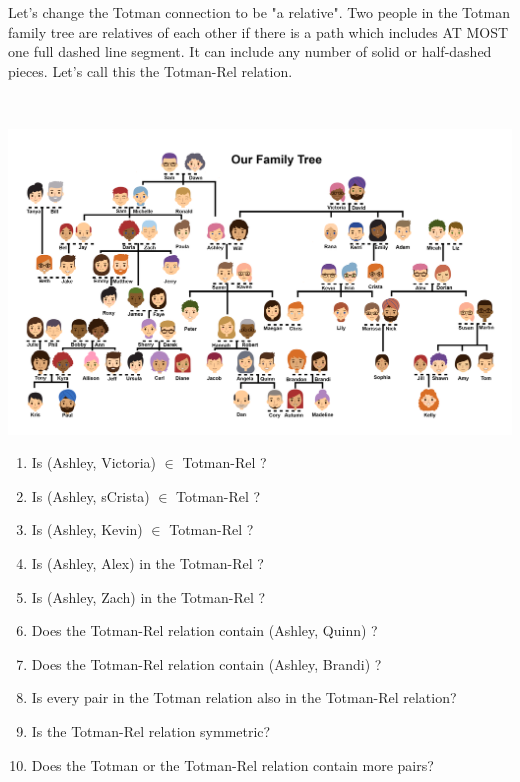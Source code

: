 \documentclass{ximera}
\begin{document}
                                                                                                            
Let's change the Totman connection to be "a relative". Two people in the Totman family tree are relatives of each other if there is a path which includes AT MOST one full dashed line segment. It can include any number of solid or half-dashed pieces. Let's call this the Totman-Rel relation.



\begin{exercise}
\quad \\
\begin{center}
\begin{image}
\includegraphics{Totman_Family_Tree.png}
\end{image}
\end{center}
\begin{enumerate}
\item Is (Ashley, Victoria) $\in$ Totman-Rel ? 





\item Is (Ashley, sCrista) $\in$ Totman-Rel ? 


\item Is (Ashley, Kevin) $\in$ Totman-Rel ?  
\item Is (Ashley, Alex) in the  Totman-Rel ?  
\item Is (Ashley, Zach) in the  Totman-Rel ?
\item Does the Totman-Rel relation contain (Ashley, Quinn) ?
\item Does the Totman-Rel relation contain (Ashley, Brandi) ?
\item Is every pair in the Totman relation also in the Totman-Rel relation?
\item Is the Totman-Rel relation symmetric?
\item Does the Totman or the Totman-Rel relation contain more pairs?
\end{enumerate}

\end{exercise}
\end{document}
